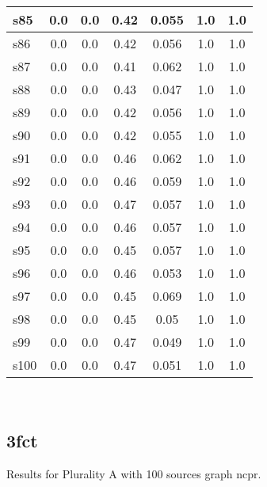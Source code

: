 \documentclass{article}
\begin{document}
\begin{tabular}{|l|c|c|c|c|c|c|}
\hline
s85 &0.0 & 0.0 & 0.42 & 0.055 & 1.0 & 1.0\\
\hline
s86 &0.0 & 0.0 & 0.42 & 0.056 & 1.0 & 1.0\\
\hline
s87 &0.0 & 0.0 & 0.41 & 0.062 & 1.0 & 1.0\\
\hline
s88 &0.0 & 0.0 & 0.43 & 0.047 & 1.0 & 1.0\\
\hline
s89 &0.0 & 0.0 & 0.42 & 0.056 & 1.0 & 1.0\\
\hline
s90 &0.0 & 0.0 & 0.42 & 0.055 & 1.0 & 1.0\\
\hline
s91 &0.0 & 0.0 & 0.46 & 0.062 & 1.0 & 1.0\\
\hline
s92 &0.0 & 0.0 & 0.46 & 0.059 & 1.0 & 1.0\\
\hline
s93 &0.0 & 0.0 & 0.47 & 0.057 & 1.0 & 1.0\\
\hline
s94 &0.0 & 0.0 & 0.46 & 0.057 & 1.0 & 1.0\\
\hline
s95 &0.0 & 0.0 & 0.45 & 0.057 & 1.0 & 1.0\\
\hline
s96 &0.0 & 0.0 & 0.46 & 0.053 & 1.0 & 1.0\\
\hline
s97 &0.0 & 0.0 & 0.45 & 0.069 & 1.0 & 1.0\\
\hline
s98 &0.0 & 0.0 & 0.45 & 0.05 & 1.0 & 1.0\\
\hline
s99 &0.0 & 0.0 & 0.47 & 0.049 & 1.0 & 1.0\\
\hline
s100 &0.0 & 0.0 & 0.47 & 0.051 & 1.0 & 1.0\\
\hline
\end{tabular}\\

\newpage

\subsection{3fct}

\noindent Results for Plurality A with 100 sources graph ncpr.
\end{document}
